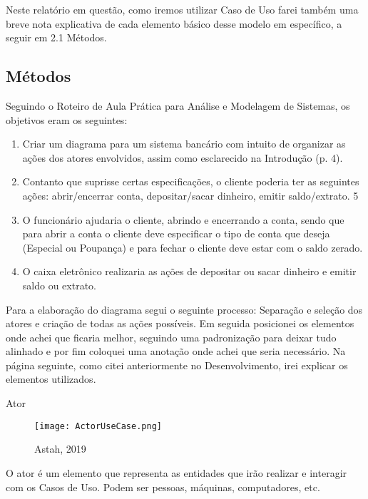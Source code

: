 \documentclass[12pt, a4paper]{article}
\begin{document}
Neste relatório em questão, como iremos utilizar Caso de Uso farei
também uma breve nota explicativa de cada elemento básico desse modelo
em específico, a seguir em 2.1 Métodos.

\vspace{1cm}
\subsection{Métodos}

Seguindo o Roteiro de Aula Prática para Análise e Modelagem de
Sistemas, os objetivos eram os seguintes:
\begin{enumerate}
   \item Criar um diagrama para um sistema bancário com intuito de
organizar as ações dos atores envolvidos, assim como esclarecido na
Introdução (p. 4).
   \item Contanto que suprisse certas especificações, o cliente poderia ter as
seguintes ações: abrir/encerrar conta, depositar/sacar dinheiro, emitir
saldo/extrato.
5
   \item O funcionário ajudaria o cliente, abrindo e encerrando a conta,
sendo que para abrir a conta o cliente deve especificar o tipo de conta que
deseja (Especial ou Poupança) e para fechar o cliente deve estar com o
saldo zerado.
   \item O caixa eletrônico realizaria as ações de depositar ou sacar
dinheiro e emitir saldo ou extrato.
\end{enumerate}

Para a elaboração do diagrama segui o seguinte processo: Separação
e seleção dos atores e criação de todas as ações possíveis. Em seguida
posicionei os elementos onde achei que ficaria melhor, seguindo uma
padronização para deixar tudo alinhado e por fim coloquei uma anotação
onde achei que seria necessário.
Na página seguinte, como citei anteriormente no Desenvolvimento, irei explicar os
elementos utilizados.

\newpage
\vspace{0.75cm}

{\Large Ator}
\begin{figure}[h]
   \centering
   \texttt{[image: ActorUseCase.png]}
   \caption{Astah, 2019}
\end{figure}

   O ator é um elemento que representa as entidades que irão realizar e
interagir com os Casos de Uso. Podem ser pessoas, máquinas,
computadores, etc.

\vspace{0.75cm}
\end{document}

